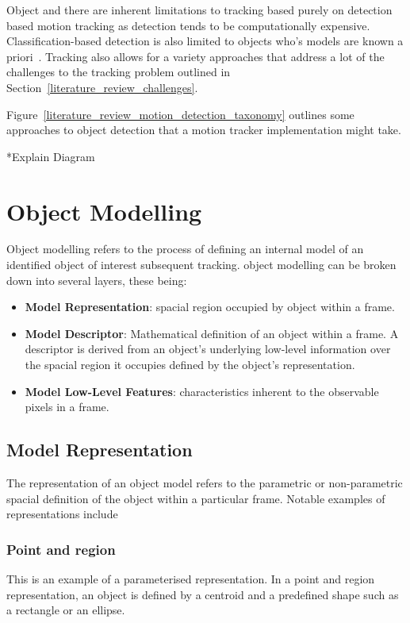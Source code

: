 Object and there are inherent limitations to tracking based purely on
detection based motion tracking as detection tends to be computationally
expensive. Classification-based detection is also limited to objects who's
models are known a priori~\cite{Forsyth2012}.
Tracking also allows for a variety approaches that address a lot of the
challenges to the tracking problem outlined in
Section~\ref{literature_review_challenges}.

Figure~\ref{literature_review_motion_detection_taxonomy} outlines some
approaches to object detection that a motion tracker implementation might take.


*Explain Diagram

\section{Object Modelling}
Object modelling refers to the process of defining an internal model of
an identified object of interest subsequent tracking. object modelling can be
broken down into several layers, these being:

\begin{itemize}
    \item \textbf{Model Representation}: spacial region occupied by object within a
        frame.
    \item \textbf{Model Descriptor}: Mathematical definition of an object within
        a frame. A descriptor is derived from an object's underlying low-level information over the spacial
        region it occupies defined by the object's representation.
    \item \textbf{Model Low-Level Features}: characteristics inherent to the
        observable pixels in a frame.
\end{itemize}

\subsection{Model Representation}
The representation of an object model refers to the parametric or non-parametric
spacial definition of the object within a particular frame. Notable examples of
representations include

\subsubsection{Point and region}
This is an example of a parameterised representation. In a point and region
representation, an object is defined by a centroid and a predefined shape such
as a rectangle or an ellipse.

